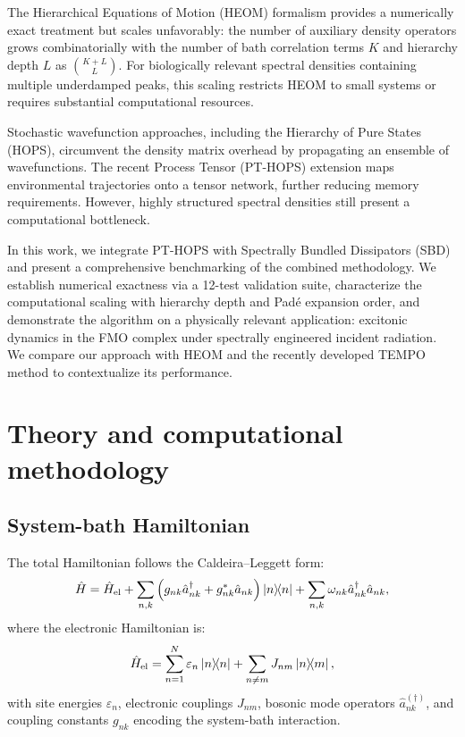 \documentclass[journal=jctc,manuscript=article]{achemso}
\begin{document}
The Hierarchical Equations of Motion (HEOM) formalism\cite{Tanimura1989,Ishizaki2009a} provides a numerically exact treatment but scales unfavorably: the number of auxiliary density operators grows combinatorially with the number of bath correlation terms $K$ and hierarchy depth $L$ as $\binom{K+L}{L}$. For biologically relevant spectral densities containing multiple underdamped peaks, this scaling restricts HEOM to small systems or requires substantial computational resources.\cite{Moix2011}

Stochastic wavefunction approaches, including the Hierarchy of Pure States (HOPS),\cite{Suess2014} circumvent the density matrix overhead by propagating an ensemble of wavefunctions. The recent Process Tensor (PT-HOPS) extension\cite{Citty2024a} maps environmental trajectories onto a tensor network, further reducing memory requirements. However, highly structured spectral densities still present a computational bottleneck.

In this work, we integrate PT-HOPS with Spectrally Bundled Dissipators (SBD)\cite{Citty2024a} and present a comprehensive benchmarking of the combined methodology. We establish numerical exactness via a 12-test validation suite, characterize the computational scaling with hierarchy depth and Padé expansion order, and demonstrate the algorithm on a physically relevant application: excitonic dynamics in the FMO complex under spectrally engineered incident radiation. We compare our approach with HEOM\cite{Ishizaki2009a} and the recently developed TEMPO method\cite{Strathearn2018} to contextualize its performance.

\section{Theory and computational methodology}

\subsection{System-bath Hamiltonian}
The total Hamiltonian follows the Caldeira--Leggett form:\cite{Tanimura1989}
\begin{equation}
\hat{H} = \hat{H}_{\mathrm{el}} + \sum_{n,k}\left(g_{nk}\hat{a}_{nk}^\dagger + g_{nk}^*\hat{a}_{nk}\right)\dyad{n} + \sum_{n,k}\omega_{nk}\hat{a}_{nk}^\dagger\hat{a}_{nk},
\end{equation}
where the electronic Hamiltonian is:
\begin{equation}
\hat{H}_{\mathrm{el}} = \sum_{n=1}^{N} \varepsilon_n \dyad{n} + \sum_{n \neq m} J_{nm} \dyad{n}{m},
\label{eq:excitonic_hamiltonian}
\end{equation}
with site energies $\varepsilon_n$, electronic couplings $J_{nm}$, bosonic mode operators $\hat{a}_{nk}^{(\dagger)}$, and coupling constants $g_{nk}$ encoding the system-bath interaction.
\end{document}
